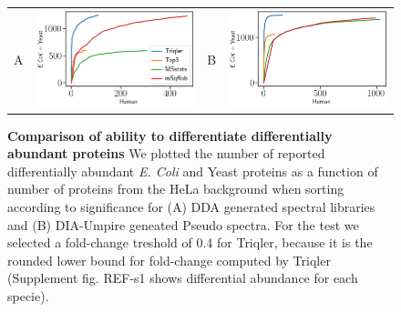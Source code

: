 \documentclass[10pt,letterpaper]{article}
\begin{document}
\begin{figure}[hbt]
    \centering
    \begin{tabular}{lclc} 

        A & \includegraphics[width=0.45\linewidth]{../../result/report_plots/osw_de_human_vs_ecoli_and_yeast.png} & 
        B & \includegraphics[width=0.45\linewidth]{../../result/report_plots/diann_de_human_vs_ecoli_and_yeast.png} \\ 

    \end{tabular}
    \caption{{\bf Comparison of ability to differentiate differentially abundant proteins} We plotted the number of reported differentially abundant  {\em E. Coli} and Yeast proteins as a function of number of proteins from the HeLa background when sorting according to significance for (A) DDA generated spectral libraries and (B) DIA-Umpire geneated Pseudo spectra. For the test we selected a fold-change treshold of 0.4 for Triqler, because it is the rounded lower bound for fold-change computed by Triqler (Supplement fig. REF-s1 shows differential abundance for each specie). \label{fig:diff_vs_hela}}
\end{figure}
\end{document}
